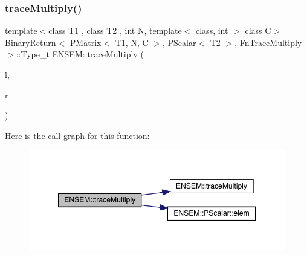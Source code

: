 \subsubsection{\texorpdfstring{traceMultiply()}{traceMultiply()}\hspace{0.1cm}{\footnotesize\ttfamily [2/3]}}
{\footnotesize\ttfamily template$<$class T1 , class T2 , int N, template$<$ class, int $>$ class C$>$ \\
\mbox{\hyperlink{structENSEM_1_1BinaryReturn}{Binary\+Return}}$<$ \mbox{\hyperlink{classENSEM_1_1PMatrix}{P\+Matrix}}$<$ T1, \mbox{\hyperlink{operator__name__util_8cc_a7722c8ecbb62d99aee7ce68b1752f337}{N}}, C $>$, \mbox{\hyperlink{classENSEM_1_1PScalar}{P\+Scalar}}$<$ T2 $>$, \mbox{\hyperlink{structENSEM_1_1FnTraceMultiply}{Fn\+Trace\+Multiply}} $>$\+::Type\+\_\+t E\+N\+S\+E\+M\+::trace\+Multiply (\begin{DoxyParamCaption}\item[{const \mbox{\hyperlink{classENSEM_1_1PMatrix}{P\+Matrix}}$<$ T1, \mbox{\hyperlink{operator__name__util_8cc_a7722c8ecbb62d99aee7ce68b1752f337}{N}}, C $>$ \&}]{l,  }\item[{const \mbox{\hyperlink{classENSEM_1_1PScalar}{P\+Scalar}}$<$ T2 $>$ \&}]{r }\end{DoxyParamCaption})\hspace{0.3cm}{\ttfamily [inline]}}

Here is the call graph for this function\+:\nopagebreak
\begin{figure}[H]
\begin{center}
\leavevmode
\includegraphics[width=349pt]{df/d0a/group__primmatrix_gac4a39563bd9c9b587bd894f97f9e3fc4_cgraph}
\end{center}
\end{figure}
\mbox{\label{group__primmatrix_ga5b0cf4c87cad1bfd7dcad0a42d0b4ae6}} 
